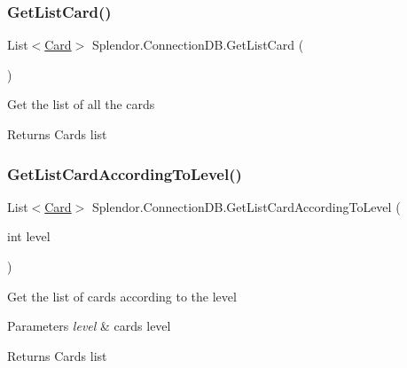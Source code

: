 \subsubsection{\texorpdfstring{Get\+List\+Card()}{GetListCard()}}
{\footnotesize\ttfamily List$<$\hyperlink{class_splendor_1_1_card}{Card}$>$ Splendor.\+Connection\+D\+B.\+Get\+List\+Card (\begin{DoxyParamCaption}{ }\end{DoxyParamCaption})}



Get the list of all the cards 

\begin{DoxyReturn}{Returns}
Cards list
\end{DoxyReturn}
\mbox{\label{class_splendor_1_1_connection_d_b_aedda6930c46d2667248333ffca06882a}} 
\subsubsection{\texorpdfstring{Get\+List\+Card\+According\+To\+Level()}{GetListCardAccordingToLevel()}}
{\footnotesize\ttfamily List$<$\hyperlink{class_splendor_1_1_card}{Card}$>$ Splendor.\+Connection\+D\+B.\+Get\+List\+Card\+According\+To\+Level (\begin{DoxyParamCaption}\item[{int}]{level }\end{DoxyParamCaption})}



Get the list of cards according to the level 


\begin{DoxyParams}{Parameters}
{\em level} & card\textquotesingle{}s level\\
\hline
\end{DoxyParams}
\begin{DoxyReturn}{Returns}
Cards list
\end{DoxyReturn}
\mbox{\label{class_splendor_1_1_connection_d_b_a5731b9d427109c1d15db9665f290bf9a}} 
